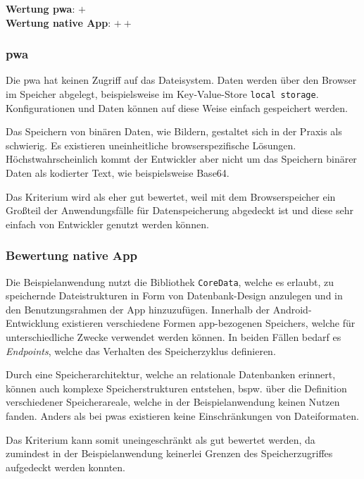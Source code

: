 \textbf{Wertung \ac{pwa}}: $+$\\
\textbf{Wertung native App}: $++$ \\

\subsubsection{\ac{pwa}}
Die \ac{pwa} hat keinen Zugriff auf das Dateisystem. Daten werden über den Browser im Speicher abgelegt, beispielsweise im Key-Value-Store \texttt{local storage}. Konfigurationen und Daten können auf diese Weise einfach gespeichert werden.

Das Speichern von binären Daten, wie Bildern, gestaltet sich in der Praxis als schwierig. Es existieren uneinheitliche browserspezifische Lösungen. Höchstwahrscheinlich kommt der Entwickler aber nicht um das Speichern binärer Daten als kodierter Text, wie beispielsweise Base64.

Das Kriterium wird als eher gut bewertet, weil mit dem Browserspeicher ein Großteil der Anwendungsfälle für Datenspeicherung abgedeckt ist und diese sehr einfach von Entwickler genutzt werden können.

\subsubsection{Bewertung native App}
Die Beispielanwendung nutzt die Bibliothek \texttt{CoreData}, welche es erlaubt, zu speichernde Dateistrukturen in Form von Datenbank-Design anzulegen und in den Benutzungsrahmen der App hinzuzufügen. Innerhalb der Android-Entwicklung existieren verschiedene Formen app-bezogenen Speichers, welche für unterschiedliche Zwecke verwendet werden können. In beiden Fällen bedarf es \textit{Endpoints}, welche das Verhalten des Speicherzyklus definieren.

Durch eine Speicherarchitektur, welche an relationale Datenbanken erinnert, können auch komplexe Speicherstrukturen entstehen, bspw. über die Definition verschiedener Speicherareale, welche in der Beispielanwendung keinen Nutzen fanden. Anders als bei \acp{pwa} existieren keine Einschränkungen von Dateiformaten.

Das Kriterium kann somit uneingeschränkt als gut bewertet werden, da zumindest in der Beispielanwendung keinerlei Grenzen des Speicherzugriffes aufgedeckt werden konnten.